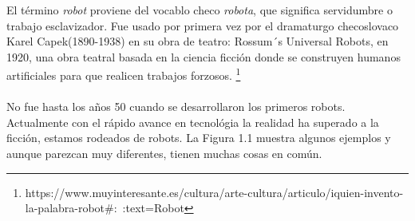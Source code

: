 El término \textit{robot} proviene del vocablo checo \textit{robota}, que significa servidumbre o trabajo esclavizador. Fue usado por primera vez por el dramaturgo checoslovaco Karel Capek(1890-1938) en su obra de teatro: Rossum´s Universal Robots, en 1920, una obra teatral basada en la ciencia ficción donde se construyen humanos artificiales para que realicen trabajos forzosos. \footnote{https://www.muyinteresante.es/cultura/arte-cultura/articulo/iquien-invento-la-palabra-robot#:~:text=Robot%
}
\\\\
No fue hasta los años 50 cuando se desarrollaron los primeros robots.
Actualmente con el rápido avance en tecnológia la realidad ha superado a la ficción, estamos rodeados de robots. La Figura 1.1 muestra algunos ejemplos y aunque parezcan muy diferentes, tienen muchas cosas en común.
\\
